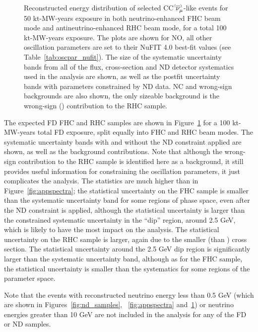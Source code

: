 \begin{figure}[htbp]
  \\
\caption{Reconstructed energy distribution of selected CC $\nu^{\bracketbar}_{\mu}$-like events for 50 kt-MW-years exposure in both neutrino-enhanced FHC beam mode and antineutrino-enhanced RHC beam mode, for a total 100 kt-MW-years exposure. The plots are shown for NO, all other oscillation parameters are set to their NuFIT 4.0 best-fit values (see Table~\ref{tab:oscpar_nufit}). The size of the systematic uncertainty bands from all of the flux, cross-section and ND detector systematics used in the analysis are shown, as well as the postfit uncertainty bands with parameters constrained by ND data. NC and wrong-sign backgrounds are also shown, the only sizeable background is the wrong-sign (\numu) contribution to the RHC sample.}
\label{fig:disspectra}
\end{figure}
The expected FD FHC \numu and RHC \anumu samples are shown in Figure~\ref{fig:disspectra} for a 100 kt-MW-years total FD exposure, split equally into FHC and RHC beam modes. The systematic uncertainty bands with and without the ND constraint applied are shown, as well as the background contributions. Note that although the wrong-sign \numu contribution to the RHC \anumu sample is identified here as a background, it still provides useful information for constraining the oscillation parameters, it just complicates the analysis. The statistics are much higher than in Figure~\ref{fig:appspectra}; the statistical uncertainty on the \numu FHC sample is smaller than the systematic uncertainty band for some regions of phase space, even after the ND constraint is applied, although the statistical uncertainty is larger than the constrained systematic uncertainty in the ``dip'' region, around 2.5 GeV, which is likely to have the most impact on the analysis. The statistical uncertainty on the \anumu RHC sample is larger, again due to the smaller \anumu (than \numu) cross section. The statistical uncertainty around the 2.5 GeV dip region is significantly larger than the systematic uncertainty band, although as for the FHC \numu sample, the statistical uncertainty is smaller than the systematics for some regions of the parameter space.

Note that the events with reconstructed neutrino energy less than 0.5 GeV (which are shown in Figures~\ref{fig:nd_samples}, ~\ref{fig:appspectra} and~\ref{fig:disspectra}) or neutrino energies greater than 10 GeV are not included in the analysis for any of the FD or ND samples.



